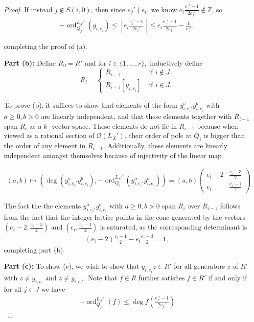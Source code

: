 \documentclass{amsart}
\theoremstyle{plain}
\theoremstyle{definition}
\theoremstyle{remark}
\numberwithin{equation}{section}
\newcommand\BZ{{\mathbb Z}}
\newcommand\sco{{\mathscr O}}
\DeclareMathOperator{\ord}{ord}
\newcommand \subhalf[1]{\frac{{#1} - 1}{2{#1}}}
\newcommand \halfcan{L}
\begin{document}
\begin{proof}
If instead $j \notin S(i,0)$, then since $e_j' \nmid e_i$, we know
$e_i\subhalf{e_j'} \notin \BZ$, so
\begin{align*}
	-\ord_{Q_j}
^{\halfcan_X'}(y_{i, e_i}) \leq \left\lfloor  e_i\subhalf{e_j'} \right\rfloor 
	\leq e_i\subhalf{e_j'} - \frac{1}{e_j'},
\end{align*}

\noindent
completing the proof of (a).

{\bf Part (b):}
Define $R_0 = R'$ and for $i \in \{1,\ldots, r\},$ inductively define 
$$R_i = \begin{cases}
	R_{i - 1} &\text{ if }i \notin J\\
	R_{i - 1}[y_{i, e_i}] &\text{ if }i \in J. 
\end{cases}$$

\noindent
To prove (b), it suffices to show that elements of the form $y_{i, e_
i'}^ay_{i, e_i}^b$ with $a \geq 0, b > 0$ are linearly independent,
and that these elements together with $R_{i - 1}$ span $R_i$ as a $k$-
vector space. These elements do not lie in $R_{i - 1}$ because when viewed as a rational section of $\sco(L_X')$, their order of pole at $Q_i$ is bigger than the order of any element in $R
_{i - 1}$. Additionally, these elements are linearly independent amongst themselves because of
injectivity of the linear map

\begin{align*}
	(a,b) \mapsto \left( \deg\left(y_{i, e_i'}^ay_{i, e_i}^b\right),-
	\ord_{Q_i}
^{\halfcan_X'}\left( y_{i, e_i'}^ay_{i, e_i}^b \right)  \right) = (a,b) 
	\begin{pmatrix}
		e_i -2 & \frac{e_i -3}{2} \\
		e_i	 & \frac{e_i - 1}{2}
	\end{pmatrix} 
\end{align*}

\noindent
The fact the the elements $y_{i, e_i'}^a y_{i, e_i}^b$ with $a \geq 0,
b > 0$ span $R_i$ over $R_{i - 1}$ follows from the fact that the
integer lattice points in the cone generated by the vectors $\left(e
_i -2, \frac{e_i -3}{2} \right)$ and $\left(e_i, \frac{e_i - 1}{2}
\right)$ is saturated, as the corresponding determinant is
\begin{align*}
	(e_i -2) \frac{e_i - 1}{2} - e_i \frac{e_i -3}{2} = 1,
\end{align*}
completing part (b).

{\bf Part (c):}
To show (c), we wish to show that $y_{i, e_i}z \in R'$ for all generators $z$ of $R'$
with $z \neq y_{i, e_i} \text{ and } z \neq y_{i, e_i'}$. Note that $f \in R$ further satisfies $f \in R'$ if and
only if for all $j \in J$ we have
\begin{align}
\label{eqn:order-degree}
	-\ord_{Q_j}
^{\halfcan_X'}(f) \leq \deg f \left( \subhalf {e_j'} \right) 
\end{align}


\end{proof}
\end{document}
